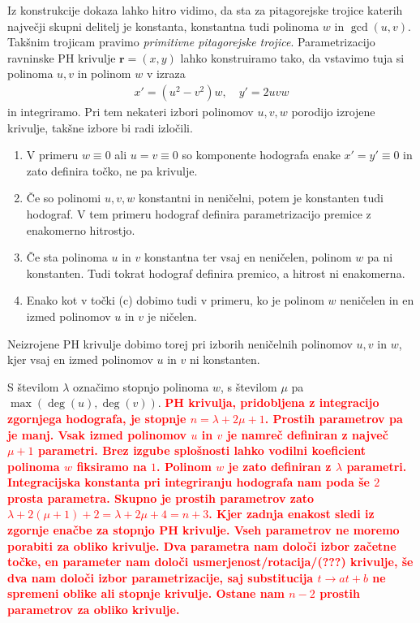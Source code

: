 \documentclass[isrm2, tisk]{fmfdelo}
\newcommand{\mycomment}[1]{\textbf{\textcolor{red}{#1}}}
\begin{document}
    \noindent Iz konstrukcije dokaza lahko hitro vidimo, da sta za pitagorejske trojice katerih največji skupni delitelj je konstanta, konstantna tudi polinoma $w$ in $\gcd(u,v)$.
    Takšnim trojicam pravimo \textit{primitivne pitagorejske trojice}.
    Parametrizacijo ravninske PH krivulje $\mathbf{r}=(x,y)$ lahko konstruiramo tako, da vstavimo tuja si polinoma $u,v$ in polinom $w$ v izraza
    \begin{align}
        x'=(u^2-v^2)w,\quad y'=2uvw  \label{eq:hodograf-splosni}
    \end{align} in integriramo.
    Pri tem nekateri izbori polinomov $u,v,w$ porodijo izrojene krivulje, takšne izbore bi radi izločili.
    \begin{enumerate}
        \itemsep0em
        \item V primeru $w\equiv 0$ ali $u=v \equiv 0$ so komponente hodografa enake $x'=y'\equiv 0$ in zato definira točko, ne pa krivulje.
        \item  Če so polinomi $u,v,w$ konstantni in neničelni, potem je konstanten tudi hodograf.
        V tem primeru hodograf definira parametrizacijo premice z enakomerno hitrostjo.
        \item  Če sta polinoma $u$ in $v$ konstantna ter vsaj en neničelen, polinom $w$ pa ni konstanten.
        Tudi tokrat hodograf definira premico, a hitrost ni enakomerna.
        \item Enako kot v točki (c) dobimo tudi v primeru, ko je polinom $w$ neničelen in en izmed polinomov $u$ in $v$ je ničelen.
    \end{enumerate}
    \vspace{-0.3cm}
    \noindent Neizrojene PH krivulje dobimo torej pri izborih neničelnih polinomov $u,v$ in $w$, kjer vsaj en izmed polinomov $u$ in $v$ ni konstanten.

    \noindent S številom $\lambda$ označimo stopnjo polinoma $w$, s številom $\mu$ pa $\max(\deg(u),\deg(v))$.
    \mycomment{
        PH krivulja, pridobljena z integracijo zgornjega hodografa, je stopnje $n=\lambda + 2\mu + 1$.
        Prostih parametrov pa je manj.
        Vsak izmed polinomov $u$ in $v$ je namreč definiran z največ $\mu + 1$ parametri.
        Brez izgube splošnosti lahko vodilni koeficient polinoma $w$ fiksiramo na $1$.
        Polinom $w$ je zato definiran z $\lambda$ parametri.
        Integracijska konstanta pri integriranju hodografa nam poda še $2$ prosta parametra.
        Skupno je prostih parametrov zato $\lambda + 2(\mu+1)+2=\lambda + 2\mu+4 = n+3$.
        Kjer zadnja enakost sledi iz zgornje enačbe za stopnjo PH krivulje.
        Vseh parametrov ne moremo porabiti za obliko krivulje.
        Dva parametra nam določi izbor začetne točke, en parameter nam določi usmerjenost/rotacija/(???) krivulje, še dva nam določi izbor parametrizacije, saj substitucija $t\to at+b$ ne spremeni oblike ali stopnje krivulje.
        Ostane nam $n-2$ prostih parametrov za obliko krivulje.}
\end{document}
